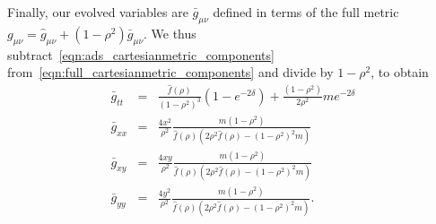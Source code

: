 \documentclass[prl,twocolumn,superscriptaddress]{revtex4-1}
\begin{document}
Finally, our evolved variables are $\bar{g}_{\mu\nu}$ defined in terms of the full metric $g_{\mu\nu}=\hat{g}_{\mu\nu}+(1-\rho^2)\bar{g}_{\mu\nu}$.
We thus subtract~\eqref{eqn:ads_cartesianmetric_components} from~\eqref{eqn:full_cartesianmetric_components} and divide by $1-\rho^2$, to obtain
\begin{eqnarray}\label{eqn:barred_cartesianmetric_components}
\bar{g}_{tt} &=& \frac{\hat{f}(\rho)}{(1-\rho^2)^3} (1-e^{-2\delta}) + \frac{(1-\rho^2)}{2\rho^2} m e^{-2\delta} \nonumber \\
\bar{g}_{xx} &=& \frac{4x^2}{\rho^2} \frac{m(1-\rho^2)}{\hat{f}(\rho) \left( 2\rho^2\hat{f}(\rho)-(1-\rho^2)^2m \right)} \nonumber \\
\bar{g}_{xy} &=& \frac{4xy}{\rho^2} \frac{m(1-\rho^2)}{\hat{f}(\rho) \left( 2\rho^2\hat{f}(\rho)-(1-\rho^2)^2m \right)} \nonumber \\
\bar{g}_{yy} &=& \frac{4y^2}{\rho^2} \frac{m(1-\rho^2)}{\hat{f}(\rho) \left( 2\rho^2\hat{f}(\rho)-(1-\rho^2)^2m \right)}.
\end{eqnarray}



\end{document}

